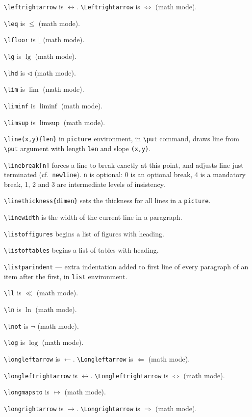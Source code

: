 \verb"\leftrightarrow" is $\leftrightarrow$. \verb"\Leftrightarrow" is
	$\Leftrightarrow$ (math mode).

\verb"\leq" is $\leq$ (math mode).

\verb"\lfloor" is $\lfloor$ (math mode).

\verb"\lg" is $\lg$ (math mode).

\verb"\lhd" is $\lhd$ (math mode).

\verb"\lim" is $\lim$ (math mode).

\verb"\liminf" is $\liminf$ (math mode).

\verb"\limsup" is $\limsup$ (math mode).

\verb"\line(x,y){len}" in \verb"picture" environment, in \verb"\put" command,
	draws line from \verb"\put" argument with length \verb"len" and
	slope \verb"(x,y)".

\verb"\linebreak[n]" forces a line to break exactly at this point, and
	adjusts line just terminated (cf.\ \verb"newline"). \verb"n" is
	optional: 0 is an optional break, 4 is a mandatory
	break, 1, 2 and 3 are intermediate levels of insistency.
\label{break-ref}

\verb"\linethickness{dimen}" sets the thickness for all lines in a
	\verb"picture".

\verb"\linewidth" is the width of the current line in a paragraph.

\verb"\listoffigures" begins a list of figures with heading.

\verb"\listoftables" begins a list of tables with heading.

\verb"\listparindent" --- extra indentation added to first line of every
	paragraph of an item after the first, in \verb"list" environment.

\verb"\ll" is $\ll$ (math mode).

\verb"\ln" is $\ln$ (math mode).

\verb"\lnot" is $\lnot$ (math mode).

\verb"\log" is $\log$ (math mode).

\verb"\longleftarrow" is $\longleftarrow$.
	\verb"\Longleftarrow" is $\Longleftarrow$ (math mode).

\verb"\longleftrightarrow" is $\longleftrightarrow$.
	\verb"\Longleftrightarrow" is $\Longleftrightarrow$ (math mode).

\verb"\longmapsto" is $\longmapsto$ (math mode).

\verb"\longrightarrow" is $\longrightarrow$.
	\verb"\Longrightarrow" is $\Longrightarrow$ (math mode).

